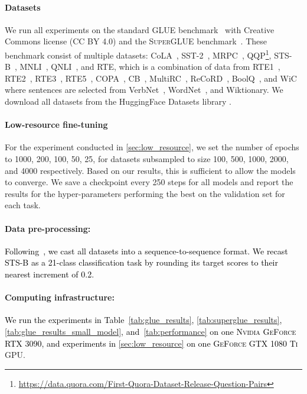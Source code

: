 \documentclass{article}
\newcommand{\change}[1]{\textcolor{black}{#1}}
\newcommand{\glue}{\textsc{GLUE}\xspace}
\newcommand{\superglue}{\textsc{SuperGLUE}\xspace}
\begin{document}
\paragraph{Datasets} We run all experiments on the standard \glue benchmark~\citep{wang2018glue} with Creative Commons license (CC BY 4.0) and the \superglue benchmark~\cite{wang2019superglue}. These benchmark consist of multiple datasets: CoLA~\citep{warstadt-etal-2019-neural}, SST-2~\citep{socher-etal-2013-recursive}, MRPC~\citep{dolan-brockett-2005-automatically}, QQP\footnote{ \url{https://data.quora.com/First-Quora-Dataset-Release-Question-Pairs}}, STS-B~\citep{cer-etal-2017-semeval}, MNLI~\citep{williams-etal-2018-broad}, QNLI~\citep{rajpurkar-etal-2016-squad}, and RTE, which is a combination of data from RTE1~\citep{dagan2005pascal}, RTE2~\citep{rte2}, RTE3~\citep{giampiccolo-etal-2007-third}, RTE5~\citep{Bentivogli09thefifth}, COPA~\citep{roemmele2011choice}, CB~\citep{de2019commitmentbank}, MultiRC~\citep{khashabi2018looking}, ReCoRD~\citep{zhang2018record}, BoolQ~\citep{clark-etal-2019-boolq}, and WiC~\citep{pilehvar2019wic} where sentences are selected from VerbNet~\citep{schuler2005verbnet}, WordNet~\citep{miller1995wordnet}, and Wiktionary. We download all datasets from the HuggingFace Datasets library \citep{2020HuggingFace-datasets}. 

\paragraph{Low-resource fine-tuning} For the experiment conducted in \textsection \ref{sec:low_resource}, we set the number of epochs to 1000, 200, 100, 50, 25, for datasets subsampled to size 100, 500, 1000, 2000, and 4000 respectively. Based on our results, this is sufficient to allow the models to converge. We save a checkpoint every 250 steps for all models and report the results for the hyper-parameters performing the best on the validation set for each task.  %

\paragraph{Data pre-processing:} \change{Following~\citet{raffel2019exploring}, we cast all datasets into a sequence-to-sequence format. We recast STS-B as a 21-class classification task by rounding its target scores to their nearest increment of 0.2.}

\paragraph{Computing infrastructure:} \change{We run the experiments in Table~\ref{tab:glue_results},  \ref{tab:superglue_results}, \ref{tab:glue_results_small_model}, and~\ref{tab:performance} on one \textsc{Nvidia GeForce RTX 3090}, and experiments in \textsection\ref{sec:low_resource} on one \textsc{GeForce GTX 1080 Ti}} GPU. 
\end{document}
